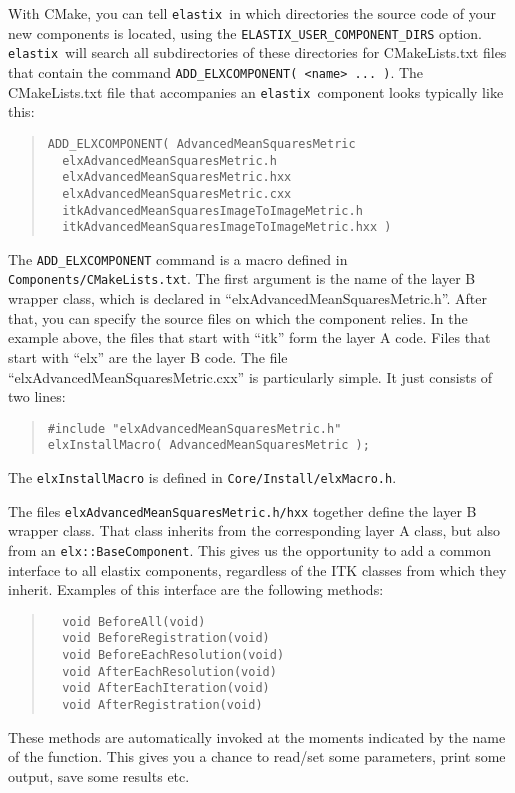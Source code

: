 \documentclass[]{report}
\newcommand{\elastix}{\texttt{elastix}}
\begin{document}
With CMake, you can tell \elastix\ in which directories the source code of your
new components is located, using the \texttt{ELASTIX\_USER\_COMPONENT\_DIRS}
option. \elastix\ will search all subdirectories of these directories for
CMakeLists.txt files that contain the command \texttt{ADD\_ELXCOMPONENT( <name>
... )}. The CMakeLists.txt file that accompanies an \elastix\ component looks
typically like this:
\begin{quote}
\begin{verbatim}
ADD_ELXCOMPONENT( AdvancedMeanSquaresMetric
  elxAdvancedMeanSquaresMetric.h
  elxAdvancedMeanSquaresMetric.hxx
  elxAdvancedMeanSquaresMetric.cxx
  itkAdvancedMeanSquaresImageToImageMetric.h
  itkAdvancedMeanSquaresImageToImageMetric.hxx )
 \end{verbatim}
 \end{quote}
The \texttt{ADD\_ELXCOMPONENT} command is a macro defined in
\texttt{Components/CMakeLists.txt}. The first argument is the name
of the layer B wrapper class, which is declared in
``elxAdvancedMeanSquaresMetric.h''. After that, you can specify the
source files on which the component relies. In the example above,
the files that start with ``itk'' form the layer A code. Files that
start with ``elx'' are the layer B code. The file
``elxAdvancedMeanSquaresMetric.cxx'' is particularly simple. It just
consists of two lines:
\begin{quote}
\begin{verbatim}
#include "elxAdvancedMeanSquaresMetric.h"
elxInstallMacro( AdvancedMeanSquaresMetric );
\end{verbatim}
\end{quote}
The \texttt{elxInstallMacro} is defined in
\texttt{Core/Install/elxMacro.h}.

The files \texttt{elxAdvancedMeanSquaresMetric.h/hxx} together define the layer
B wrapper class. That class inherits from the corresponding layer A class, but
also from an \texttt{elx::BaseComponent}. This gives us the opportunity to add
a common interface to all elastix components, regardless of the ITK classes
from which they inherit. Examples of this interface are the following methods:
\begin{quote}
\begin{verbatim}
  void BeforeAll(void)
  void BeforeRegistration(void)
  void BeforeEachResolution(void)
  void AfterEachResolution(void)
  void AfterEachIteration(void)
  void AfterRegistration(void)
\end{verbatim}
\end{quote}
These methods are automatically invoked at the moments indicated by the name of
the function. This gives you a chance to read/set some parameters, print some
output, save some results etc.
\end{document}

